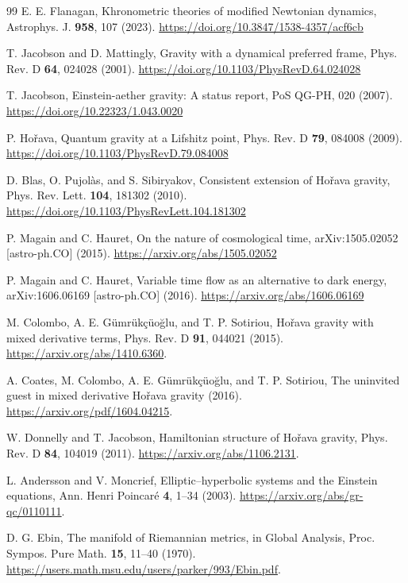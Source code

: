 \documentclass[aps,prd,reprint,onecolumn,notitlepage,nofootinbib,longbibliography,floatfix]{revtex4-2}
\theoremstyle{scstyle}
\theoremstyle{definition}
\theoremstyle{remark}
\begin{document}
\begin{thebibliography}{99}
E. E. Flanagan, Khronometric theories of modified Newtonian dynamics, Astrophys. J. \textbf{958}, 107 (2023). \url{https://doi.org/10.3847/1538-4357/acf6cb}

T. Jacobson and D. Mattingly, Gravity with a dynamical preferred frame, Phys. Rev. D \textbf{64}, 024028 (2001). \url{https://doi.org/10.1103/PhysRevD.64.024028}

T. Jacobson, Einstein-aether gravity: A status report, PoS QG-PH, 020 (2007). \url{https://doi.org/10.22323/1.043.0020}

P. Ho\v{r}ava, Quantum gravity at a Lifshitz point, Phys. Rev. D \textbf{79}, 084008 (2009). \url{https://doi.org/10.1103/PhysRevD.79.084008}

D. Blas, O. Pujol\`as, and S. Sibiryakov, Consistent extension of Ho\v{r}ava gravity, Phys. Rev. Lett. \textbf{104}, 181302 (2010). \url{https://doi.org/10.1103/PhysRevLett.104.181302}

P. Magain and C. Hauret, On the nature of cosmological time, arXiv:1505.02052 [astro-ph.CO] (2015). \url{https://arxiv.org/abs/1505.02052}

P. Magain and C. Hauret, Variable time flow as an alternative to dark energy, arXiv:1606.06169 [astro-ph.CO] (2016). \url{https://arxiv.org/abs/1606.06169}

M. Colombo, A. E. G\"umr\"uk\c c\"uo\u glu, and T. P. Sotiriou,
Ho\v rava gravity with mixed derivative terms,
Phys. Rev. D \textbf{91}, 044021 (2015).
\url{https://arxiv.org/abs/1410.6360}.

A. Coates, M. Colombo, A. E. G\"umr\"uk\c c\"uo\u glu, and T. P. Sotiriou,
The uninvited guest in mixed derivative Ho\v rava gravity (2016).
\url{https://arxiv.org/pdf/1604.04215}.

W. Donnelly and T. Jacobson,
Hamiltonian structure of Ho\v rava gravity,
Phys. Rev. D \textbf{84}, 104019 (2011).
\url{https://arxiv.org/abs/1106.2131}.

L. Andersson and V. Moncrief,
Elliptic--hyperbolic systems and the Einstein equations,
Ann. Henri Poincar\'e \textbf{4}, 1--34 (2003).
\url{https://arxiv.org/abs/gr-qc/0110111}.


D. G. Ebin, The manifold of Riemannian metrics, in Global Analysis,
Proc. Sympos. Pure Math. \textbf{15}, 11--40 (1970).
\url{https://users.math.msu.edu/users/parker/993/Ebin.pdf}.


\end{thebibliography}
\end{document}
